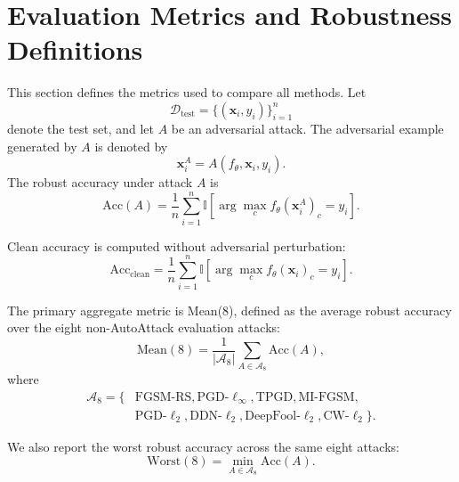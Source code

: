 \section{Evaluation Metrics and Robustness Definitions}
\label{sec:ch5_evaluation_metrics}

This section defines the metrics used to compare all methods. Let
\[
    \mathcal{D}_{\mathrm{test}}
    =
    \{(\mathbf{x}_i, y_i)\}_{i=1}^{n}
\]
denote the test set, and let \(A\) be an adversarial attack. The adversarial example
generated by \(A\) is denoted by
\[
    \mathbf{x}_i^{A} = A(f_\theta, \mathbf{x}_i, y_i).
\]
The robust accuracy under attack \(A\) is
\begin{equation}
    \mathrm{Acc}(A)
    =
    \frac{1}{n}
    \sum_{i=1}^{n}
    \mathbb{I}
    \left[
        \arg\max_c f_\theta(\mathbf{x}_i^{A})_c = y_i
    \right].
    \label{eq:attack_acc}
\end{equation}

Clean accuracy is computed without adversarial perturbation:
\begin{equation}
    \mathrm{Acc}_{\mathrm{clean}}
    =
    \frac{1}{n}
    \sum_{i=1}^{n}
    \mathbb{I}
    \left[
        \arg\max_c f_\theta(\mathbf{x}_i)_c = y_i
    \right].
\end{equation}

The primary aggregate metric is Mean(8), defined as the average robust accuracy over the
eight non-AutoAttack evaluation attacks:
\begin{equation}
    \mathrm{Mean}(8)
    =
    \frac{1}{|\mathcal{A}_{8}|}
    \sum_{A \in \mathcal{A}_{8}}
    \mathrm{Acc}(A),
    \label{eq:mean8}
\end{equation}
where
\[
\begin{aligned}
\mathcal{A}_{8}
=
\{&
\text{FGSM-RS},
\text{PGD-}\ell_\infty,
\text{TPGD},
\text{MI-FGSM},\\
&
\text{PGD-}\ell_2,
\text{DDN-}\ell_2,
\text{DeepFool-}\ell_2,
\text{CW-}\ell_2
\}.
\end{aligned}
\]

We also report the worst robust accuracy across the same eight attacks:
\begin{equation}
    \mathrm{Worst}(8)
    =
    \min_{A \in \mathcal{A}_{8}}
    \mathrm{Acc}(A).
    \label{eq:worst8}
\end{equation}

